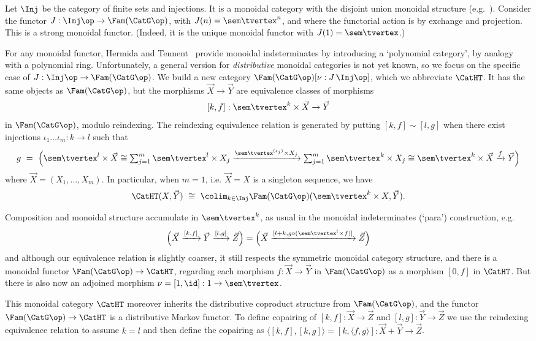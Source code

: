 Let $\Inj$ be the category of finite sets and injections. It is a
monoidal category with the disjoint union monoidal structure (e.g.~\cite{fiore-comb,power-local}).
Consider the functor $J:\Inj\op\to \Fam(\CatG\op)$, with
$J(n)=\sem\tvertex^n$, and where the functorial action is by
exchange and projection. This is a strong monoidal functor. (Indeed, it is
the unique monoidal functor with $J(1)=\sem\tvertex$.)

For any monoidal functor, Hermida and Tennent~\cite{hermida-tennent}
provide monoidal indeterminates by introducing a
`polynomial category', by analogy with a polynomial ring.
Unfortunately, a  general version for \emph{distributive} monoidal categories is not yet known,
so we focus on the specific case of $J:\Inj\op\to \Fam(\CatG\op)$. We build a new category
$\Fam(\CatG\op)[\nu:J\,\Inj\op]$, which we abbreviate $\CatHT$. It has the same objects as
$\Fam(\CatG\op)$, but the morphisms $\vec X\to \vec Y$ are equivalence classes of morphisms
\[
[k,f]: \sem\tvertex^{k}\times \vec X\to \vec Y
\]
in $\Fam(\CatG\op)$, modulo reindexing. The reindexing equivalence relation is generated by putting $[k,f]\sim [l,g]$ when
there exist injections $\iota_1\dots \iota_m:k\to l $ such that 
\[  g\  =\  \textstyle\Big(\sem\tvertex^{l}\times \vec X
  \cong \sum_{j=1}^m \sem\tvertex^l\times X_j
  \xrightarrow{\sem\tvertex^{(\iota_j)}\times X_j}
  \sum_{j=1}^m \sem\tvertex^k\times X_j\cong \sem\tvertex^k\times \vec X
  \xrightarrow f
  \vec Y\Big)
\]
where $\vec X=(X_1,\dots, X_m)$. In particular, when $m=1$, i.e. $\vec X=X$ is a singleton sequence, we have
\begin{equation}\label{eqn:CatHT}
  \CatHT(X,\vec Y)\  \cong\ \colim_{k\in\Inj}\Fam(\CatG\op)(\sem\tvertex ^k\times X,\vec Y)\text.
\end{equation}

Composition and monoidal structure accumulate in $\sem\tvertex^k$,
as usual in the monoidal indeterminates (`para') construction, 
e.g.
\[
  \Big(\vec X\xrightarrow {[k,f]} \vec Y
  \xrightarrow{[l,g]}
  \vec Z\Big)
  =
  \Big(\vec X\xrightarrow {[l+k,g\circ (\sem \tvertex^l \times f)]}
  \vec Z\Big)
\]
and although our equivalence relation is slightly coarser, it still respects the symmetric monoidal category structure,
and there is a monoidal functor $\Fam(\CatG\op)\to \CatHT$,
regarding each morphism $f:\vec X\to \vec Y$ in $\Fam(\CatG\op)$ as a morphism $[0,f]$ in $\CatHT$.
But there is also now an adjoined morphism $\nu=[1,\id]:1\to \sem\tvertex$.

This monoidal category $\CatHT$ moreover inherits the distributive coproduct structure from $\Fam(\CatG\op)$, and the functor $\Fam(\CatG\op)\to \CatHT$ is a distributive Markov functor.
To define copairing of $[k,f]:\vec X\to\vec Z$ and $[l,g]:\vec Y\to \vec Z$ we use the reindexing equivalence relation to assume $k=l$
and then define the copairing as $\langle [k,f],[k,g]\rangle=[k,\langle f,g\rangle] : \vec X+\vec Y\to\vec Z$. 

